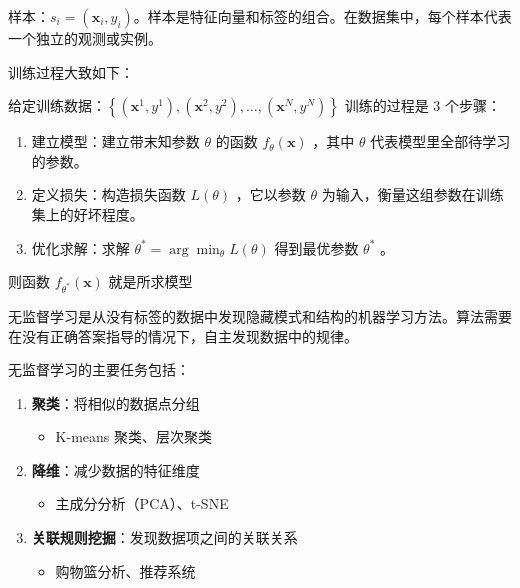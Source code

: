 \begin{definition}[样本]
    样本：$s_i=\left(\mathbf{x}_i, y_i\right)$。样本是特征向量和标签的组合。在数据集中，每个样本代表一个独立的观测或实例。
\end{definition}

训练过程大致如下：

给定训练数据：$\left\{\left(\mathbf{x}^1, y^1\right),\left(\mathbf{x}^2, y^2\right), \ldots,\left(\mathbf{x}^N, y^N\right)\right\}$
训练的过程是 3 个步骤：
\begin{enumerate}
    \item 建立模型：建立带末知参数 $\theta$ 的函数 $f_\theta(\mathbf{x})$ ，其中 $\theta$ 代表模型里全部待学习的参数。
    \item 定义损失：构造损失函数 $L(\theta)$ ，它以参数 $\theta$ 为输入，衡量这组参数在训练集上的好坏程度。
    \item 优化求解：求解 $\theta^*=\arg \min _\theta L(\theta)$ 得到最优参数 $\theta^*$ 。
\end{enumerate}

则函数 $f_{\theta^*}(\mathbf{x})$ 就是所求模型

\begin{definition}[无监督学习]
    无监督学习是从没有标签的数据中发现隐藏模式和结构的机器学习方法。算法需要在没有正确答案指导的情况下，自主发现数据中的规律。
\end{definition}

\begin{example}[无监督学习任务类型]
    无监督学习的主要任务包括：
    \begin{enumerate}
        \item \textbf{聚类}：将相似的数据点分组
              \begin{itemize}
                  \item K-means 聚类、层次聚类
              \end{itemize}
        \item \textbf{降维}：减少数据的特征维度
              \begin{itemize}
                  \item 主成分分析（PCA）、t-SNE
              \end{itemize}
        \item \textbf{关联规则挖掘}：发现数据项之间的关联关系
              \begin{itemize}
                  \item 购物篮分析、推荐系统
              \end{itemize}
    \end{enumerate}
\end{example}


